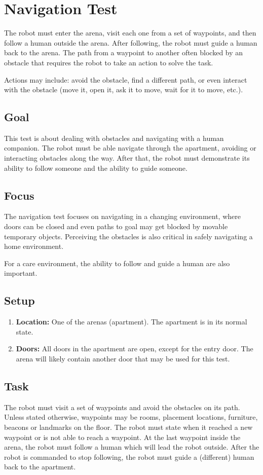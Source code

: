 \section{Navigation Test}

The robot must enter the arena, visit each one from a set of waypoints, and then follow a human outside the arena. After following, the robot must guide a human back to the arena. 
The path from a waypoint to another often blocked by an obstacle that requires the robot to take an action to solve the task.

Actions may include: avoid the obstacle, find a different path, or even interact with the obstacle (move it, open it, ask it to move, wait for it to move, etc.).

\subsection{Goal}
This test is about dealing with obstacles and navigating with a human companion. 
The robot must be able navigate through the apartment, avoiding or interacting obstacles along the way.
After that, the robot must demonstrate its ability to follow someone and the ability to guide someone. 

\subsection{Focus}
The navigation test focuses on navigating in a changing environment, where doors can be closed and even paths to goal may get blocked by movable temporary objects.
Perceiving the obstacles is also critical in safely navigating a home environment.

For a care environment, the ability to follow and guide a human are also important. 

\subsection{Setup}

\begin{enumerate}
	\item \textbf{Location:} One of the arenas (apartment). The apartment is in its normal state.
	\item \textbf{Doors:} All doors in the apartment are open, except for the entry door. 
	The arena will likely contain another door that may be used for this test. 
\end{enumerate}

\subsection{Task}
The robot must visit a set of waypoints and avoid the obstacles on its path. Unless stated otherwise, waypoints may be rooms, placement locations, furniture, beacons or landmarks on the floor. 
The robot must state when it reached a new waypoint or is not able to reach a waypoint. 
At the last waypoint inside the arena, the robot must follow a human which will lead the robot outside. 
After the robot is commanded to stop following, the robot must guide a (different) human back to the apartment. 

